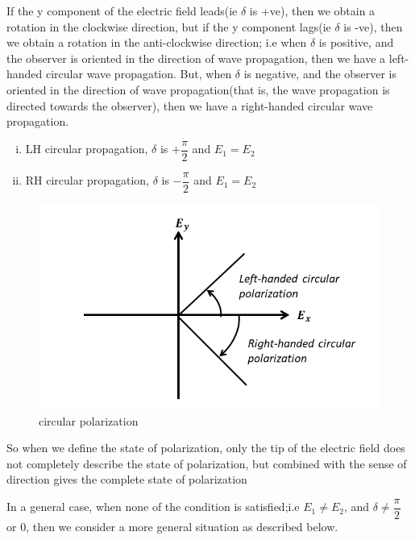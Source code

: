 If the y component of the electric field leads(ie $\delta$ is +ve), then we obtain a rotation in the clockwise direction, but if the y component lags(ie $\delta$ is -ve), then we obtain a rotation in the anti-clockwise direction; i.e when $\delta$ is positive, and the observer is oriented in the direction of wave propagation, then we have a left-handed circular wave propagation. But, when $\delta$ is negative, and the observer is oriented in the direction of wave propagation(that is, the wave propagation is directed towards the observer), then we have a right-handed circular wave propagation.
\begin{enumerate}[(i)]
\item LH circular propagation, $\delta$ is $ +\dfrac{\pi}{2}$ and $ E_1 = E_2$
\item RH circular propagation, $\delta$ is $-\dfrac{\pi}{2}$ and $ E_1 = E_2$ 
\end{enumerate}
\begin{figure}[h]
\centering
\includegraphics[width=1\linewidth]{./graphics/circular_polarization}
\caption{circular polarization}
\end{figure} 

So when we define the state of polarization, only the tip of the electric field does not completely describe the state of polarization, but combined with the sense of direction gives the complete state of polarization

In a general case, when none of the condition is satisfied;i.e $ E_1 \neq E_2$, and $\delta\neq\dfrac{\pi}{2}$ or $ 0 $, then we consider a more general situation as described below.

